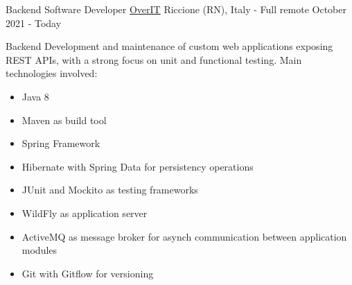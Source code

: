 

\begin{cventries}

\cventry
	{Backend Software Developer} %
	{\href{https://overit.it/}{OverIT}} %
	{Riccione (RN), Italy - Full remote} %
	{October 2021 - Today} %
	{
		Backend Development and maintenance of custom web applications exposing REST APIs, with a strong focus on unit and functional testing.
		Main technologies involved:
		\begin{itemize}
			\item {Java 8}
			\item {Maven as build tool}
			\item {Spring Framework}
			\item {Hibernate with Spring Data for persistency operations}
			\item {JUnit and Mockito as testing frameworks}
			\item {WildFly as application server}
			\item {ActiveMQ as message broker for asynch communication between application modules}
			\item {Git with Gitflow for versioning}
		\end{itemize}
	}



\end{cventries}

